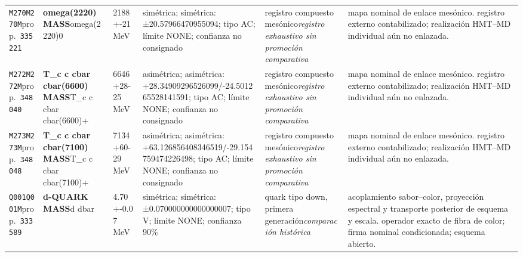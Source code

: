 \begin{landscape}
\begin{longtable}{L{1.85cm}L{4.45cm}L{2.35cm}L{4.05cm}L{3.35cm}L{7.15cm}}
\texttt{M270}\newline \texttt{M270M}\newline prop.\ \texttt{335221} & \textbf{omega(2220) MASS}\newline omega(2220)0 & 2188+-21\,MeV & simétrica; simétrica: ±20.57966470955094; tipo AC; límite NONE; confianza no consignado & registro compuesto mesónico\newline \emph{registro exhaustivo sin promoción comparativa} & mapa nominal de enlace mesónico. registro externo contabilizado; realización HMT--MD individual aún no enlazada. \\
\texttt{M272}\newline \texttt{M272M}\newline prop.\ \texttt{348040} & \textbf{T\_\allowbreak{}c c cbar cbar(6600) MASS}\newline T\_\allowbreak{}c c cbar cbar(6600)+ & 6646+28-25\,MeV & asimétrica; asimétrica: +28.34909296526099/-24.501265528141591; tipo AC; límite NONE; confianza no consignado & registro compuesto mesónico\newline \emph{registro exhaustivo sin promoción comparativa} & mapa nominal de enlace mesónico. registro externo contabilizado; realización HMT--MD individual aún no enlazada. \\
\texttt{M273}\newline \texttt{M273M}\newline prop.\ \texttt{348048} & \textbf{T\_\allowbreak{}c c cbar cbar(7100) MASS}\newline T\_\allowbreak{}c c cbar cbar(7100)+ & 7134+60-29\,MeV & asimétrica; asimétrica: +63.126856408346519/-29.154759474226498; tipo AC; límite NONE; confianza no consignado & registro compuesto mesónico\newline \emph{registro exhaustivo sin promoción comparativa} & mapa nominal de enlace mesónico. registro externo contabilizado; realización HMT--MD individual aún no enlazada. \\
\texttt{Q001}\newline \texttt{Q001M}\newline prop.\ \texttt{333589} & \textbf{d-QUARK MASS}\newline d \textbar{}\allowbreak{} dbar & 4.70+-0.07\,MeV & simétrica; simétrica: ±0.070000000000000007; tipo V; límite NONE; confianza 90\% & quark tipo down, primera generación\newline \emph{comparación histórica} & acoplamiento sabor--color, proyección espectral y transporte posterior de esquema y escala. operador exacto de fibra de color; firma nominal condicionada; esquema abierto. \\

\end{longtable}
\end{landscape}
